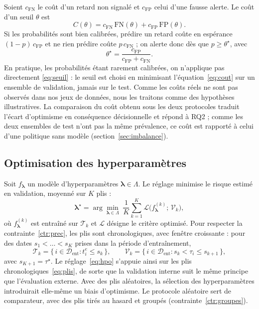 \documentclass[11pt,a4paper]{article}
\theoremstyle{definition}
\begin{document}
Soient $c_{\mathrm{FN}}$ le coût d'un retard non signalé et $c_{\mathrm{FP}}$ celui d'une fausse alerte. Le coût d'un seuil $\theta$ est
\begin{equation}
  C(\theta) = c_{\mathrm{FN}}\,\mathrm{FN}(\theta) + c_{\mathrm{FP}}\,\mathrm{FP}(\theta).
  \label{eq:cout}
\end{equation}
Si les probabilités sont bien calibrées, prédire un retard coûte en espérance $(1-p)\,c_{\mathrm{FP}}$ et ne rien prédire coûte $p\,c_{\mathrm{FN}}$ ; on alerte donc dès que $p \ge \theta^\star$, avec
\begin{equation}
  \theta^\star = \frac{c_{\mathrm{FP}}}{c_{\mathrm{FP}} + c_{\mathrm{FN}}}.
  \label{eq:seuil}
\end{equation}
En pratique, les probabilités étant rarement calibrées, on n'applique pas directement \eqref{eq:seuil} : le seuil est choisi en minimisant l'équation~\eqref{eq:cout} sur un ensemble de validation, jamais sur le test. Comme les coûts réels ne sont pas observés dans nos jeux de données, nous les traitons comme des hypothèses illustratives. La comparaison du coût obtenu sous les deux protocoles traduit l'écart d'optimisme en conséquence décisionnelle et répond à RQ2 ; comme les deux ensembles de test n'ont pas la même prévalence, ce coût est rapporté à celui d'une politique sans modèle (section~\ref{sec:imbalance}).

\subsection{Optimisation des hyperparamètres}
\label{sec:hpo}

Soit $f_{\boldsymbol\lambda}$ un modèle d'hyperparamètres $\boldsymbol\lambda \in \Lambda$. Le réglage minimise le risque estimé en validation, moyenné sur $K$ plis :
\begin{equation}
  \boldsymbol\lambda^\star = \arg\min_{\boldsymbol\lambda \in \Lambda} \; \frac{1}{K} \sum_{k=1}^{K} \mathcal{L}\bigl(f^{(k)}_{\boldsymbol\lambda};\, \mathcal{V}_k\bigr),
  \label{eq:hpo}
\end{equation}
où $f^{(k)}_{\boldsymbol\lambda}$ est entraîné sur $\mathcal{T}_k$ et $\mathcal{L}$ désigne le critère optimisé. Pour respecter la contrainte~\ref{ctr:prec}, les plis sont chronologiques, avec fenêtre croissante : pour des dates $s_1 < \dots < s_K$ prises dans la période d'entraînement,
\begin{equation}
  \mathcal{T}_k = \{\, i \in \mathcal{D}_{\mathrm{ent}} : t_i^{e} \le s_k \,\}, \qquad
  \mathcal{V}_k = \{\, i \in \mathcal{D}_{\mathrm{ent}} : s_k < \tau_i \le s_{k+1} \,\},
  \label{eq:plis}
\end{equation}
avec $s_{K+1} = \tau^\star$. Le réglage~\eqref{eq:hpo} s'appuie ainsi sur les plis chronologiques~\eqref{eq:plis}, de sorte que la validation interne suit le même principe que l'évaluation externe. Avec des plis aléatoires, la sélection des hyperparamètres introduirait elle-même un biais d'optimisme. Le protocole aléatoire sert de comparateur, avec des plis tirés au hasard et groupés (contrainte~\ref{ctr:groupes}).
\end{document}
